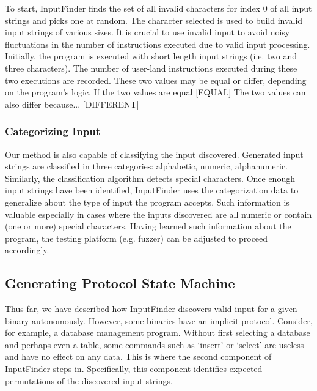 \documentclass{acm_proc_article-sp}
\def \tool {InputFinder}
\begin{document}
To start, \tool{} finds the set of all invalid characters for index 0 of all input strings and picks one at random.
The character selected is used to build invalid input strings of various sizes.
It is crucial to use invalid input to avoid noisy fluctuations in the number of instructions executed due to valid input processing.
Initially, the program is executed with short length input strings (i.e. two and three characters).
The number of user-land instructions executed during these two executions are recorded.
These two values may be equal or differ, depending on the program's logic.
If the two values are equal [EQUAL]
The two values can also differ because... [DIFFERENT]

\subsubsection{Categorizing Input}
Our method is also capable of classifying the input discovered.
Generated input strings are classified in three categories: alphabetic, numeric, alphanumeric.
Similarly, the classification algorithm detects special characters.
Once enough input strings have been identified, \tool{} uses the categorization data to generalize about the type of input the program accepts.
Such information is valuable especially in cases where the inputs discovered are all numeric or contain (one or more) special characters.
Having learned such information about the program, the testing platform (e.g. fuzzer) can be adjusted to proceed accordingly.

\subsection{Generating Protocol State Machine}
Thus far, we have described how \tool{} discovers valid input for a given binary autonomously.
However, some binaries have an implicit protocol.
Consider, for example, a database management program.
Without first selecting a database and perhaps even a table, some commands such as `insert' or `select' are useless and have no effect on any data.
This is where the second component of \tool{} steps in.
Specifically, this component identifies expected permutations of the discovered input strings.
\end{document}
